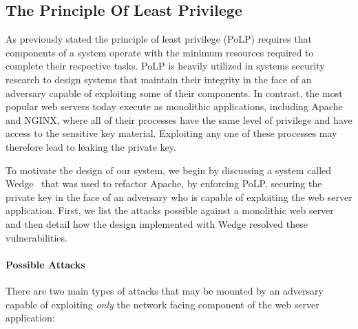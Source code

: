 \documentclass[../main.tex]{subfiles}
\begin{document}
     
\subsection{The Principle Of Least Privilege}     

As previously stated the principle of least privilege (PoLP) requires that
components of a system operate with the minimum resources required to complete
their respective tasks. PoLP is heavily utilized in systems security research to
design systems that maintain their integrity in the face of an adversary capable
of exploiting some of their components. In contrast, the most popular web
servers today execute as monolithic applications, including Apache and NGINX,
where all of their processes have the same level of privilege and have access to
the sensitive key material. Exploiting any one of these processes may therefore
lead to leaking the private key.

To motivate the design of our system, we begin by discussing a system called
Wedge~\cite{Bittau08} that was used to refactor Apache, by enforcing PoLP,
securing the private key in the face of an adversary who is capable of
exploiting the web server application. First, we list the attacks possible
against a monolithic web server and then detail how the design implemented
with Wedge resolved these vulnerabilities.

\paragraph{Possible Attacks}

There are two main types of attacks that may be mounted by an adversary capable
of exploiting \textit{only} the network facing component of the web server
application:
\end{document}
